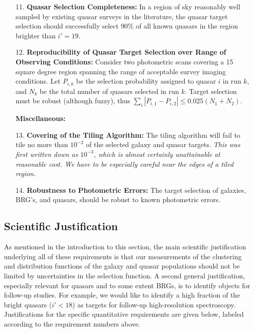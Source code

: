 \begin{enumerate}
\item[11.] {\bf Quasar Selection Completeness:} 
In a region of sky reasonably well
sampled by existing quasar surveys in the literature, the quasar
target selection should successfully select 90\% of all known quasars
in the region brighter than $i' = 19$. 
\item[12.] {\bf Reproducibility of Quasar Target Selection over Range
of Observing Conditions:} Consider two photometric scans covering a 
15 square degree region spanning
the range of acceptable survey imaging conditions.  Let $P_{i,k}$ be
the selection probability assigned to quasar $i$ in run $k$, and $N_k$
be the total number of quasars selected in run $k$.  Target
selection must be robust (although fuzzy), thus $\sum_i|P_{i,1} - P_{i,2}| \le 0.025(N_1
+ N_2)$. 

\centerline{\bf Miscellaneous:}
\item[13.] {\bf Covering of the Tiling Algorithm:} The tiling
algorithm will fail to tile no more than $10^{-2}$ of 
the selected galaxy and quasar targets.  {\it This was first written down as
$10^{-3}$, which is almost certainly unattainable at reasonable cost.
We have to be especially careful near the edges of a tiled region.}
\item[14.] {\bf Robustness to Photometric Errors:} The target
selection of galaxies, BRG's, and quasars, should be robust to known
photometric errors. 
\end{enumerate}

\subsection{Scientific Justification}

As mentioned in the introduction to this section, the main scientific
justification underlying all of these requirements is that our
measurements of the clustering and distribution functions
of the galaxy and quasar populations should not be limited by
uncertainties in the selection function.  
A second general justification, especially relevant for quasars
and to some extent BRGs, is to identify objects for follow-up studies.
For example, we would like to identify a high fraction of the
bright quasars ($i'<18$) as targets for follow-up high-resolution spectroscopy.
Justifications for the specific quantitative requirements are given
below, labeled according to the requirement numbers above.

